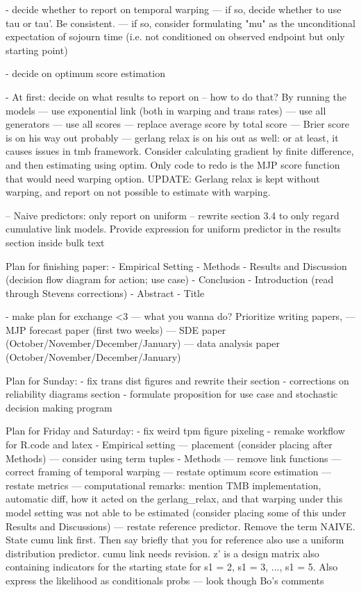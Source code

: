 - decide whether to report on temporal warping
--- if so, decide whether to use tau or tau'. Be consistent.
--- if so, consider formulating "mu" as the unconditional expectation of sojourn time (i.e. not conditioned on observed endpoint but only starting point)

- decide on optimum score estimation

- At first: decide on what results to report on
-- how to do that? By running the models
--- use exponential link (both in warping and trans rates)
--- use all generators
--- use all scores
--- replace average score by total score
--- Brier score is on his way out probably
--- gerlang relax is on his out as well: or at least, it causes issues in tmb framework. Consider calculating gradient by finite difference, and then estimating using optim. Only code to redo is the MJP score function that would need warping option. UPDATE: Gerlang relax is kept without warping, and report on not possible to estimate with warping.


-- Naive predictors: only report on uniform
-- rewrite section 3.4 to only regard cumulative link models. Provide expression for uniform predictor in the results section inside bulk text






Plan for finishing paper:
- Empirical Setting
- Methods
- Results and Discussion (decision flow diagram for action; use case)
- Conclusion
- Introduction (read through Stevens corrections)
- Abstract 
- Title

- make plan for exchange <3
--- what you wanna do? Prioritize writing papers, 
--- MJP forecast paper (first two weeks)
--- SDE paper (October/November/December/January)
--- data analysis paper (October/November/December/January)




Plan for Sunday: 
- fix trans dist figures and rewrite their section %
- corrections on reliability diagrams section %
- formulate proposition for use case and stochastic decision making program %


Plan for Friday and Saturday:
- fix weird tpm figure pixeling %
- remake workflow for R.code and latex %
- Empirical setting %
--- placement (consider placing after Methods) %
--- consider using term tuples %
- Methods
--- remove link functions %
--- correct framing of temporal warping %
--- restate optimum score estimation %
--- restate metrics %
--- computational remarks: mention TMB implementation, automatic diff, how it acted on the gerlang_relax, and that warping under this model setting was not able to be estimated (consider placing some of this under Results and Discussions) %
--- restate reference predictor. Remove the term NAIVE. State cumu link first. Then say briefly that you for reference also use a uniform distribution predictor. cumu link needs revision. z' is a design matrix also containing indicators for the starting state for s1 = 2, s1 = 3, ..., s1 = 5. Also express the likelihood as conditionals probs %
--- look though Bo's comments %



